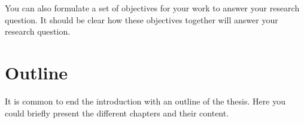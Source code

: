 You can also formulate a set of objectives for your work to answer your research question.  It should be clear how these objectives together will answer your research question.

\section{Outline}

It is common to end the introduction with an outline of the thesis. Here you could briefly present the different chapters and their content.